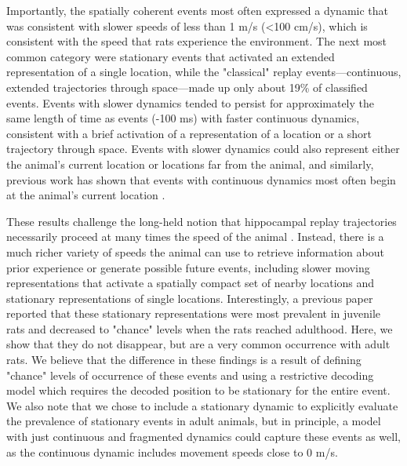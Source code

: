 \documentclass[9pt,lineno]{elife}
\begin{document}
Importantly, the spatially coherent events most often expressed a dynamic that was consistent with slower speeds of less than 1 m/s (<100 cm/s), which is consistent with the speed that rats experience the environment. The next most common category were stationary events \citep{YuDistincthippocampalcorticalmemory2017, FarooqEmergencepreconfiguredplastic2019} that activated an extended representation of a single location, while the "classical" replay events---continuous, extended trajectories through space---made up only about 19\% of classified events. Events with slower dynamics tended to persist for approximately the same length of time as events (-100 ms) with faster continuous dynamics, consistent with a brief activation of a representation of a location or a short trajectory through space. Events with slower dynamics could also represent either the animal's current location or locations far from the animal, and similarly, previous work has shown that events with continuous dynamics most often begin at the animal's current location \citep{DavidsonHippocampalReplayExtended2009, KarlssonAwakereplayremote2009}.

These results challenge the long-held notion that hippocampal replay trajectories necessarily proceed at many times the speed of the animal \citep{NadasdyReplayTimeCompression1999, LeeMemorySequentialExperience2002, DavidsonHippocampalReplayExtended2009}. Instead, there is a much richer variety of speeds the animal can use to retrieve information about prior experience or generate possible future events, including slower moving representations that activate a spatially compact set of nearby locations and stationary representations of single locations. Interestingly, a previous paper \citep{FarooqEmergencepreconfiguredplastic2019} reported that these stationary representations were most prevalent in juvenile rats and decreased to "chance" levels when the rats reached adulthood. Here, we show that they do not disappear, but are a very common occurrence with adult rats. We believe that the difference in these findings is a result of defining "chance" levels of occurrence of these events and using a restrictive decoding model which requires the decoded position to be stationary for the entire event. We also note that we chose to include a stationary dynamic to explicitly evaluate the prevalence of stationary events in adult animals, but in principle, a model with just continuous and fragmented dynamics could capture these events as well, as the continuous dynamic includes movement speeds close to 0 m/s.
\end{document}
